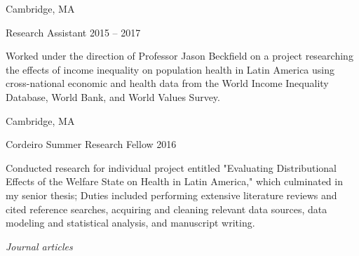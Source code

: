 \documentclass[11pt,article,oneside]{memoir}
\begin{document}
\bigskip

 \hfill Cambridge, MA

\ind Research Assistant\vspace{0.02in} \hfill 2015 -- 2017

{\noindent \footnotesize Worked under the direction of Professor Jason Beckfield on a project researching the effects of income
inequality on population health in Latin America using cross-national economic and health data from the
World Income Inequality Database, World Bank, and World Values Survey.}

\bigskip

 \hfill Cambridge, MA

\ind Cordeiro Summer Research Fellow\vspace{0.02in} \hfill 2016

{\noindent \footnotesize Conducted research for individual project entitled "Evaluating Distributional Effects of the Welfare State on
Health in Latin America," which culminated in my senior thesis; Duties included performing extensive
literature reviews and cited reference searches, acquiring and cleaning relevant data sources, data modeling
and statistical analysis, and manuscript writing.}

\newpage

\medskip

\noindent\emph{Journal articles \vspace{0.05in}}

\end{document}
